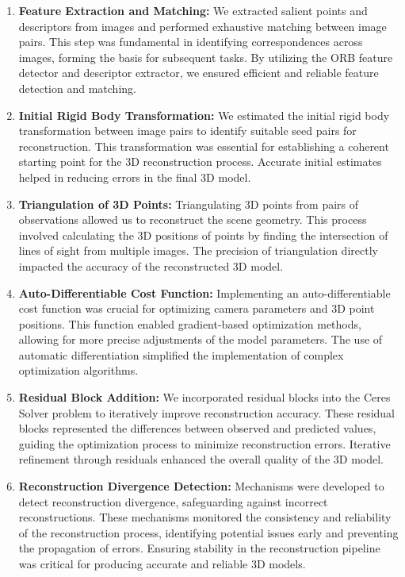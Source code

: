 \documentclass{article}
\begin{document}
\begin{enumerate}
\item \textbf{Feature Extraction and Matching:} We extracted salient points and descriptors from images and performed exhaustive matching between image pairs. This step was fundamental in identifying correspondences across images, forming the basis for subsequent tasks. By utilizing the ORB feature detector and descriptor extractor, we ensured efficient and reliable feature detection and matching.

\item \textbf{Initial Rigid Body Transformation:} We estimated the initial rigid body transformation between image pairs to identify suitable seed pairs for reconstruction. This transformation was essential for establishing a coherent starting point for the 3D reconstruction process. Accurate initial estimates helped in reducing errors in the final 3D model.

\item \textbf{Triangulation of 3D Points:} Triangulating 3D points from pairs of observations allowed us to reconstruct the scene geometry. This process involved calculating the 3D positions of points by finding the intersection of lines of sight from multiple images. The precision of triangulation directly impacted the accuracy of the reconstructed 3D model.

\item \textbf{Auto-Differentiable Cost Function:} Implementing an auto-differentiable cost function was crucial for optimizing camera parameters and 3D point positions. This function enabled gradient-based optimization methods, allowing for more precise adjustments of the model parameters. The use of automatic differentiation simplified the implementation of complex optimization algorithms.

\item \textbf{Residual Block Addition:} We incorporated residual blocks into the Ceres Solver problem to iteratively improve reconstruction accuracy. These residual blocks represented the differences between observed and predicted values, guiding the optimization process to minimize reconstruction errors. Iterative refinement through residuals enhanced the overall quality of the 3D model.

\item \textbf{Reconstruction Divergence Detection:} Mechanisms were developed to detect reconstruction divergence, safeguarding against incorrect reconstructions. These mechanisms monitored the consistency and reliability of the reconstruction process, identifying potential issues early and preventing the propagation of errors. Ensuring stability in the reconstruction pipeline was critical for producing accurate and reliable 3D models.
\end{enumerate}
\end{document}
